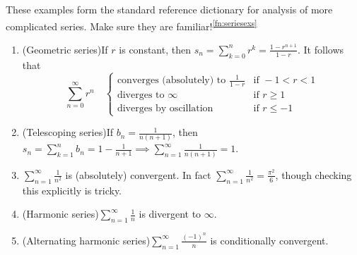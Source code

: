 

\goodbreak


\begin{examples}{}{}
	These examples form the standard reference dictionary for analysis of more complicated series. Make sure they are familiar!\textsuperscript{\ref{fn:seriesexs}}\vspace{-10pt}
	\addtocounter{footnote}{1}%
	\begin{enumerate}\itemsep0pt
	  \item (Geometric series)\quad If $r$ is constant, then $s_n=\sum\limits_{k=0}^n r^k=\frac{1-r^{n+1}}{1-r}$.
	  It follows that
	  \[
	  	\sum_{n=0}^\infty r^n\quad  
	  	\begin{cases}
	  		\text{converges (absolutely) to }\frac 1{1-r}&\text{if }-1<r<1\\
	  		\text{diverges to }\infty&\text{if }r\ge 1\\
	  		\text{diverges by oscillation}&\text{if }r\le -1
	  	\end{cases}
	  \]
	  \item (Telescoping series)\quad If $b_n=\frac 1{n(n+1)}$, then $s_n=\sum\limits_{k=1}^nb_n =1-\frac 1{n+1}\implies \sum\limits_{n=1}^\infty\frac 1{n(n+1)}=1$.
	  \item $\sum\limits_{n=1}^\infty \frac 1{n^2}$ is (absolutely) convergent. In fact $\sum\limits_{n=1}^\infty\frac 1{n^2}=\frac{\pi^2}6$, though checking this explicitly is tricky.
	  \item (Harmonic series)\quad $\sum\limits_{n=1}^\infty\frac 1n$ is divergent to $\infty$.
		\item (Alternating harmonic series)\quad $\sum\limits_{n=1}^\infty \frac{(-1)^n}n$ is conditionally convergent.
	\end{enumerate}
\end{examples}


